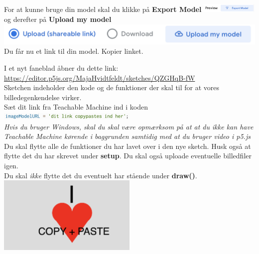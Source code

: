 \documentclass{ucph-handout}
\begin{document}
\newpage
\begin{exercisebox}[adjusted title= Exporter model]



For at kunne bruge din model skal du klikke på \textbf{Export Model} \includegraphics[width=0.2\textwidth]{ikoner/export.png} og derefter på \textbf{Upload my model}\\ \includegraphics[width=1\textwidth]{ikoner/uploadmodle.png}\\

Du får nu et link til din model. Kopier linket. \\
\vspace{3mm}

\noindent
{}
\vspace{3mm}
I et nyt faneblad åbner du dette link: \\

\url{https://editor.p5js.org/MajaHvidtfeldt/sketches/QZGHqB-fW}\\

Sketchen indeholder den kode og de funktioner der skal til for at vores billedegenkendelse virker. \\

Sæt dit link fra Teachable Machine ind i koden\\

\includegraphics[width=0.5\textwidth]{nyebilleder/linktcopy.png}\\

\textit{Hvis du bruger Windows, skal du skal være opmærksom på at at du ikke kan have Teachable Machine kørende i baggrunden samtidig med at du bruger video i p5.js}\\

\vspace{3mm}
Du skal flytte alle de funktioner du har lavet over i den nye sketch. Husk også at flytte det du har skrevet under \textbf{setup}. Du skal også uploade eventuelle billedfiler igen. \\

Du skal \textit{ikke} flytte det du eventuelt har stående under \textbf{draw()}. \\

\includegraphics[width=0.5\textwidth]{nyebilleder/heartcopy.png}


\end{exercisebox}
\end{document}

